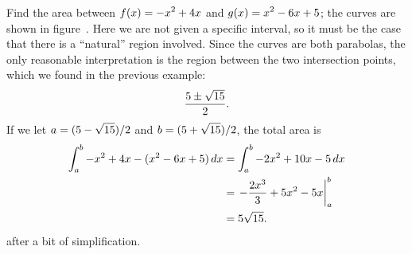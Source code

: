 
\begin{example} Find the area between $\displaystyle f(x)= -x^2+4x$ and
$\displaystyle g(x)=x^2-6x+5$; the
curves are shown in figure~. Here we
are not given a specific interval, so it must be the case that there
is a ``natural'' region involved. Since the curves are both parabolas,
the only reasonable interpretation is the region between the two
intersection points, which we found in the previous example:
$${5\pm\sqrt{15}\over2}.$$
If we let $\displaystyle a=(5-\sqrt{15})/2$ and $\displaystyle b=(5+\sqrt{15})/2$,
the total area is 
\begin{align*}
  \int_a^b -x^2+4x-(x^2-6x+5)\,dx
  &=\int_a^b -2x^2+10x-5\,dx \\
  &=\left.-{2x^3\over3}+5x^2-5x\right|_a^b \\
  &=5\sqrt{15}. \\
\end{align*}
after a bit of simplification.
\end{example}


